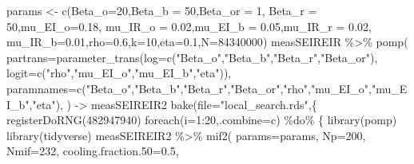 \documentclass[
]{article}
\newenvironment{Shaded}{\begin{snugshade}}{\end{snugshade}}
\newcommand{\AttributeTok}[1]{\textcolor[rgb]{0.77,0.63,0.00}{#1}}
\newcommand{\DecValTok}[1]{\textcolor[rgb]{0.00,0.00,0.81}{#1}}
\newcommand{\FloatTok}[1]{\textcolor[rgb]{0.00,0.00,0.81}{#1}}
\newcommand{\FunctionTok}[1]{\textcolor[rgb]{0.00,0.00,0.00}{#1}}
\newcommand{\NormalTok}[1]{#1}
\newcommand{\OtherTok}[1]{\textcolor[rgb]{0.56,0.35,0.01}{#1}}
\newcommand{\SpecialCharTok}[1]{\textcolor[rgb]{0.00,0.00,0.00}{#1}}
\newcommand{\StringTok}[1]{\textcolor[rgb]{0.31,0.60,0.02}{#1}}
\begin{document}
\begin{Shaded}
\begin{Highlighting}[]
\NormalTok{params }\OtherTok{\textless{}{-}} \FunctionTok{c}\NormalTok{(}\AttributeTok{Beta\_o=}\DecValTok{20}\NormalTok{,}\AttributeTok{Beta\_b =} \DecValTok{50}\NormalTok{,}\AttributeTok{Beta\_or =} \DecValTok{1}\NormalTok{, }\AttributeTok{Beta\_r =} \DecValTok{50}\NormalTok{,}\AttributeTok{mu\_EI\_o=}\FloatTok{0.18}\NormalTok{,}
             \AttributeTok{mu\_IR\_o =} \FloatTok{0.02}\NormalTok{,}\AttributeTok{mu\_EI\_b =} \FloatTok{0.05}\NormalTok{,}\AttributeTok{mu\_IR\_r =} \FloatTok{0.02}\NormalTok{, }
             \AttributeTok{mu\_IR\_b=}\FloatTok{0.01}\NormalTok{,}\AttributeTok{rho=}\FloatTok{0.6}\NormalTok{,}\AttributeTok{k=}\DecValTok{10}\NormalTok{,}\AttributeTok{eta=}\FloatTok{0.1}\NormalTok{,}\AttributeTok{N=}\DecValTok{84340000}\NormalTok{)}
\NormalTok{measSEIREIR }\SpecialCharTok{\%\textgreater{}\%}
  \FunctionTok{pomp}\NormalTok{(}
    \AttributeTok{partrans=}\FunctionTok{parameter\_trans}\NormalTok{(}\AttributeTok{log=}\FunctionTok{c}\NormalTok{(}\StringTok{"Beta\_o"}\NormalTok{,}\StringTok{"Beta\_b"}\NormalTok{,}\StringTok{"Beta\_r"}\NormalTok{,}\StringTok{"Beta\_or"}\NormalTok{),}
                             \AttributeTok{logit=}\FunctionTok{c}\NormalTok{(}\StringTok{"rho"}\NormalTok{,}\StringTok{"mu\_EI\_o"}\NormalTok{,}\StringTok{"mu\_EI\_b"}\NormalTok{,}\StringTok{"eta"}\NormalTok{)),}
    \AttributeTok{paramnames=}\FunctionTok{c}\NormalTok{(}\StringTok{"Beta\_o"}\NormalTok{,}\StringTok{"Beta\_b"}\NormalTok{,}\StringTok{"Beta\_r"}\NormalTok{,}\StringTok{"Beta\_or"}\NormalTok{,}\StringTok{"rho"}\NormalTok{,}\StringTok{"mu\_EI\_o"}\NormalTok{,}\StringTok{"mu\_EI\_b"}\NormalTok{,}\StringTok{"eta"}\NormalTok{),}
\NormalTok{  ) }\OtherTok{{-}\textgreater{}}\NormalTok{ measSEIREIR2}
\FunctionTok{bake}\NormalTok{(}\AttributeTok{file=}\StringTok{"local\_search.rds"}\NormalTok{,\{}
  \FunctionTok{registerDoRNG}\NormalTok{(}\DecValTok{482947940}\NormalTok{)}
  \FunctionTok{foreach}\NormalTok{(}\AttributeTok{i=}\DecValTok{1}\SpecialCharTok{:}\DecValTok{20}\NormalTok{,}\AttributeTok{.combine=}\NormalTok{c) }\SpecialCharTok{\%do\%}\NormalTok{ \{}
    \FunctionTok{library}\NormalTok{(pomp)}
    \FunctionTok{library}\NormalTok{(tidyverse)}
\NormalTok{    measSEIREIR2 }\SpecialCharTok{\%\textgreater{}\%}
      \FunctionTok{mif2}\NormalTok{(}
        \AttributeTok{params=}\NormalTok{params,}
        \AttributeTok{Np=}\DecValTok{200}\NormalTok{, }\AttributeTok{Nmif=}\DecValTok{232}\NormalTok{,}
        \AttributeTok{cooling.fraction.50=}\FloatTok{0.5}\NormalTok{,}

\end{Highlighting}
\end{Shaded}
\end{document}
